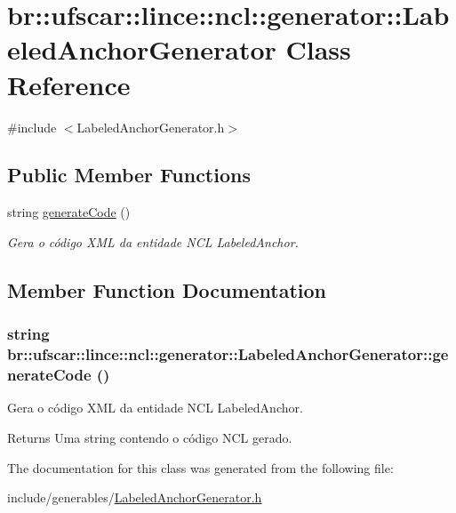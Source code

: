 \hypertarget{classbr_1_1ufscar_1_1lince_1_1ncl_1_1generator_1_1LabeledAnchorGenerator}{
\section{br::ufscar::lince::ncl::generator::LabeledAnchorGenerator Class Reference}
\label{classbr_1_1ufscar_1_1lince_1_1ncl_1_1generator_1_1LabeledAnchorGenerator}
}


{\ttfamily \#include $<$LabeledAnchorGenerator.h$>$}

\subsection*{Public Member Functions}
\begin{DoxyCompactItemize}
\item 
string \hyperlink{classbr_1_1ufscar_1_1lince_1_1ncl_1_1generator_1_1LabeledAnchorGenerator_aeb99df1946c8a7c9a9d72ef422b0b8ef}{generateCode} ()
\begin{DoxyCompactList}\small\item\em Gera o código XML da entidade NCL LabeledAnchor. \item\end{DoxyCompactList}\end{DoxyCompactItemize}


\subsection{Member Function Documentation}
\hypertarget{classbr_1_1ufscar_1_1lince_1_1ncl_1_1generator_1_1LabeledAnchorGenerator_aeb99df1946c8a7c9a9d72ef422b0b8ef}{
\subsubsection[{generateCode}]{\setlength{\rightskip}{0pt plus 5cm}string br::ufscar::lince::ncl::generator::LabeledAnchorGenerator::generateCode ()}}
\label{classbr_1_1ufscar_1_1lince_1_1ncl_1_1generator_1_1LabeledAnchorGenerator_aeb99df1946c8a7c9a9d72ef422b0b8ef}


Gera o código XML da entidade NCL LabeledAnchor. 

\begin{DoxyReturn}{Returns}
Uma string contendo o código NCL gerado. 
\end{DoxyReturn}


The documentation for this class was generated from the following file:\begin{DoxyCompactItemize}
\item 
include/generables/\hyperlink{LabeledAnchorGenerator_8h}{LabeledAnchorGenerator.h}\end{DoxyCompactItemize}
